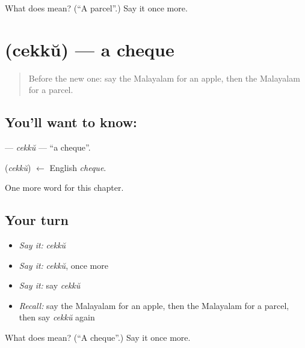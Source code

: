 \begin{tcolorbox}[breakable,colback=teal!4,colframe=teal!35!black,title={Before you move on}]
What does  mean? (\textquotedblleft{}A parcel\textquotedblright{}.) Say it once more.
\end{tcolorbox}
\section[\texorpdfstring{\ml{ചെക്ക്} (cekkŭ)}{ചെക്ക് (cekkŭ)}]{ (cekkŭ) — a cheque}

\label{lesson:ML-C288-cekku}



\begin{quote}
Before the new one: say the Malayalam for an apple, then the Malayalam for a parcel.
\end{quote}

\subsection*{You'll want to know: }
\textbf{} — \emph{cekkŭ} — \textquotedblleft{}a cheque\textquotedblright{}.

\begin{cousinweb}
\textbf{} (\emph{cekkŭ}) $\leftarrow$ English \emph{cheque}.
\end{cousinweb}

\begin{grammarlens}[title={What you've built}]
One more word for this chapter.
\end{grammarlens}

\subsection*{Your turn}
\begin{itemize}
\raggedright
  \item \emph{Say it:} \emph{cekkŭ}
  \item \emph{Say it:} \emph{cekkŭ}, once more
  \item \emph{Say it:} say \emph{cekkŭ}
  \item \emph{Recall:} say the Malayalam for an apple, then the Malayalam for a parcel, then say \emph{cekkŭ} again
\end{itemize}

\begin{tcolorbox}[breakable,colback=teal!4,colframe=teal!35!black,title={Before you move on}]
What does  mean? (\textquotedblleft{}A cheque\textquotedblright{}.) Say it once more.
\end{tcolorbox}
